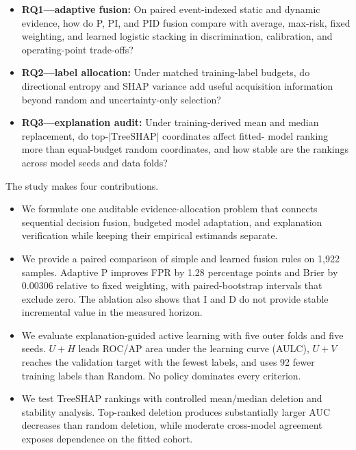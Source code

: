 \begin{itemize}
    \item \textbf{RQ1---adaptive fusion:} On paired event-indexed static and
    dynamic evidence, how do P, PI, and PID fusion compare with average,
    max-risk, fixed weighting, and learned logistic stacking in discrimination,
    calibration, and operating-point trade-offs?
    \item \textbf{RQ2---label allocation:} Under matched training-label budgets,
    do directional entropy and SHAP variance add useful acquisition information
    beyond random and uncertainty-only selection?
    \item \textbf{RQ3---explanation audit:} Under training-derived mean and
    median replacement, do top-$|\mathrm{TreeSHAP}|$ coordinates affect fitted-
    model ranking more than equal-budget random coordinates, and how stable are
    the rankings across model seeds and data folds?
\end{itemize}

The study makes four contributions.

\begin{itemize}
    \item We formulate one auditable evidence-allocation problem that connects
    sequential decision fusion, budgeted model adaptation, and explanation
    verification while keeping their empirical estimands separate.
    \item We provide a paired comparison of simple and learned fusion rules on
    1,922 samples. Adaptive P improves FPR by 1.28 percentage points and Brier by
    0.00306 relative to fixed weighting, with paired-bootstrap intervals that
    exclude zero. The ablation also shows that I and D do not provide stable
    incremental value in the measured horizon.
    \item We evaluate explanation-guided active learning with five outer folds
    and five seeds. $U+H$ leads ROC/AP area under the learning curve (AULC),
    $U+V$ reaches the validation target with the fewest labels, and \xfull
    uses 92 fewer training labels than Random. No policy dominates every
    criterion.
    \item We test TreeSHAP rankings with controlled mean/median deletion and
    stability analysis. Top-ranked deletion produces substantially larger AUC
    decreases than random deletion, while moderate cross-model agreement exposes
    dependence on the fitted cohort.
\end{itemize}

